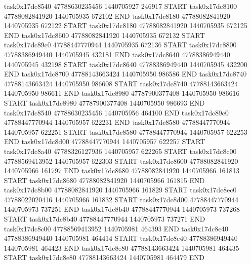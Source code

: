task0x17dc8540 47788630235456          1440705927               246917  START
task0x17dc8100 47788082841920          1440705935               672102  END
task0x17dc8180 47788082841920          1440705935               672122  START
task0x17dc8180 47788082841920          1440705935               672125  END
task0x17dc8600 47788082841920          1440705935               672132  START
task0x17dc89c0 47788447770944          1440705935               672136  START
task0x17dc8800 47788386949440          1440705945               432181  END
task0x17dc8640 47788386949440          1440705945               432198  START
task0x17dc8640 47788386949440          1440705945               432200  END
task0x17dc8700 47788143663424          1440705950               986586  END
task0x17dc8740 47788143663424          1440705950               986608  START
task0x17dc8740 47788143663424          1440705950               986611  END
task0x17dc8980 47787900377408          1440705950               986616  START
task0x17dc8980 47787900377408          1440705950               986693  END
task0x17dc8540 47788630235456          1440705956               464100  END
task0x17dc89c0 47788447770944          1440705957               622231  END
task0x17dc8580 47788447770944          1440705957               622251  START
task0x17dc8580 47788447770944          1440705957               622253  END
task0x17dc8d00 47788447770944          1440705957               622257  START
task0x17dc8a40 47788326127936          1440705957               622265  START
task0x17dc8c00 47788569413952          1440705957               622303  START
task0x17dc8600 47788082841920          1440705966               161797  END
task0x17dc8680 47788082841920          1440705966               161813  START
task0x17dc8680 47788082841920          1440705966               161815  END
task0x17dc8b00 47788082841920          1440705966               161829  START
task0x17dc8ec0 47788022020416          1440705966               161832  START
task0x17dc8d00 47788447770944          1440705973               737251  END
task0x17dc8b40 47788447770944          1440705973               737268  START
task0x17dc8b40 47788447770944          1440705973               737271  END
task0x17dc8c00 47788569413952          1440705981               464393  END
task0x17dc8c40 47788386949440          1440705981               464414  START
task0x17dc8c40 47788386949440          1440705981               464423  END
task0x17dc8e80 47788143663424          1440705981               464435  START
task0x17dc8e80 47788143663424          1440705981               464479  END

